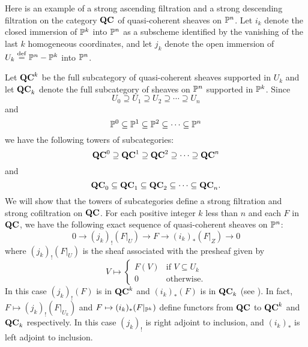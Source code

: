 \begin{ex}
Here is an example of a strong ascending filtration and a strong
descending filtration on the category $\QCoh$ of quasi-coherent
sheaves on $\P^n$. Let $i_k$ denote the closed immersion of $\P^k$ 
into $\P^n$ as a subscheme identified by the vanishing of the last 
$k$ homogeneous coordinates, and let $j_k$ denote the open 
immersion of $U_k \defeq \P^n - \P^k$ into $\P^n$. 

Let $\QCoh^k$ be the full subcategory of quasi-coherent sheaves
supported in $U_k$ and let $\QCoh_k$ denote the full subcategory of
sheaves on $\P^n$ supported in $\P^k$. Since
\[
U_0 \supseteq U_1 \supseteq U_2 \supseteq \cdots \supseteq U_n
\]
and
\[
\P^0 \subseteq \P^1 \subseteq \P^2 \subseteq \cdots \subseteq \P^n
\]
we have the following towers of subcategories:
\[
\QCoh^0 \supseteq \QCoh^1 \supseteq \QCoh^2 \supseteq \cdots
   \supseteq \QCoh^n
\]
and 
\[
\QCoh_0 \subseteq \QCoh_1 \subseteq \QCoh_2 \subseteq \cdots
   \subseteq \QCoh_n.
\]
We will show that the towers of subcategories define a strong 
filtration and strong cofiltration on $\QCoh$. For each positive 
integer $k$ less than $n$ and each $F$ in $\QCoh$, we have the 
following exact sequence of quasi-coherent sheaves on $\P^n$:
\begin{equation}\label{eq_qc_sheaf_ses}
0 \to (j_k)_!(F|_U) \to F \to (i_k)_*(F|_Z) \to 0
\end{equation}
where $(j_k)_!(F|_U)$ is the sheaf associated with the presheaf 
given by
\[
V \mapsto \begin{cases}
F(V) &\textrm{if }V \subseteq U_k\\
0    &\textrm{otherwise}.
\end{cases}
\]
In this case $(j_k)_!(F)$ is in $\QCoh^k$ and $(i_k)_*(F)$ is in 
$\QCoh_k$ (see \cite[Ex. 1.19]{Hart}). In fact, $F \mapsto 
(j_k)_!(F|_{U_k})$ and $F \mapsto (i_k)_*(F|_{\P^k})$ define
functors from $\QCoh$ to $\QCoh^k$ and $\QCoh_k$
respectively. In this case $(j_k)_!$ is right adjoint to 
inclusion, and $(i_k)_*$ is left adjoint to inclusion.


\end{ex}
